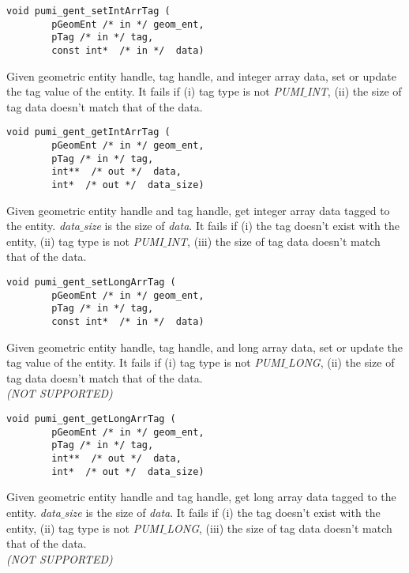 \begin{verbatim} 
void pumi_gent_setIntArrTag (
        pGeomEnt /* in */ geom_ent, 
        pTag /* in */ tag,
        const int*  /* in */  data)
\end{verbatim}\vspace{-.5cm}\hspace{1cm}
        Given geometric entity handle, tag handle, and integer array data, set or update the tag value of the entity. It fails if (i) tag type is not \emph{PUMI}$\_$\emph{INT}, (ii) the size of tag data doesn't match that of the data.

\begin{verbatim} 
void pumi_gent_getIntArrTag (
        pGeomEnt /* in */ geom_ent, 
        pTag /* in */ tag,
        int**  /* out */  data, 
        int*  /* out */  data_size)
\end{verbatim}\vspace{-.5cm}\hspace{1cm}
        Given geometric entity handle and tag handle, get integer array data tagged to the entity.  \emph{data}$\_$\emph{size} is the size of \emph{data}. It fails if (i) the tag doesn't exist with the entity, (ii) tag type is not \emph{PUMI}$\_$\emph{INT}, (iii) the size of tag data doesn't match that of the data.

\begin{verbatim} 
void pumi_gent_setLongArrTag (
        pGeomEnt /* in */ geom_ent, 
        pTag /* in */ tag,
        const int*  /* in */  data)
\end{verbatim}\vspace{-.5cm}\hspace{1cm}
        Given geometric entity handle, tag handle, and long array data, set or update the tag value of the entity. It fails if (i) tag type is not \emph{PUMI}$\_$\emph{LONG}, (ii) the size of tag data doesn't match that of the data. \\ \textit{(NOT SUPPORTED)}

\begin{verbatim} 
void pumi_gent_getLongArrTag (
        pGeomEnt /* in */ geom_ent, 
        pTag /* in */ tag,
        int**  /* out */  data, 
        int*  /* out */  data_size)
\end{verbatim}\vspace{-.5cm}\hspace{1cm}
        Given geometric entity handle and tag handle, get long array data tagged to the entity.  \emph{data}$\_$\emph{size} is the size of \emph{data}. It fails if (i) the tag doesn't exist with the entity, (ii) tag type is not \emph{PUMI}$\_$\emph{LONG}, (iii) the size of tag data doesn't match that of the data. \\ 
\textit{(NOT SUPPORTED)}

